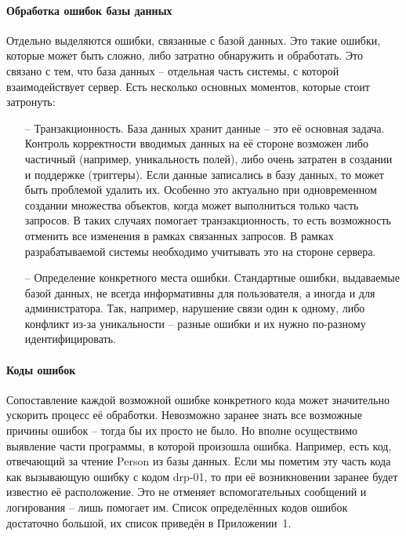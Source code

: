 \documentclass[a4paper,article]{article}
\begin{document}
\begin{sloppypar}
    \paragraph{Обработка ошибок базы данных}

    Отдельно выделяются ошибки, связанные с базой данных. Это такие ошибки, которые может быть сложно, либо затратно обнаружить и обработать. Это связано с тем, что база данных -- отдельная часть системы, с которой взаимодействует сервер. Есть несколько основных моментов, которые стоит затронуть:

    \begin{itemize}[nolistsep]
        \item[--] Транзакционность. База данных хранит данные -- это её основная задача. Контроль корректности вводимых данных на её стороне возможен либо частичный (например, уникальность полей), либо очень затратен в создании и поддержке (триггеры). Если данные записались в базу данных, то может быть проблемой удалить их. Особенно это актуально при одновременном создании множества объектов, когда может выполниться только часть запросов. В таких случаях помогает транзакционность, то есть возможность отменить все изменения в рамках связанных запросов. В рамках разрабатываемой системы необходимо учитывать это на стороне сервера.
        \item[--] Определение конкретного места ошибки. Стандартные ошибки, выдаваемые базой данных, не всегда информативны для пользователя, а иногда и для администратора. Так, например, нарушение связи один к одному, либо конфликт из-за уникальности -- разные ошибки и их нужно по-разному идентифицировать.
    \end{itemize}

    \paragraph{Коды ошибок}\label{Проектирование сервера. Коды ошибок}

    Сопоставление каждой возможной ошибке конкретного кода может значительно ускорить процесс её обработки. Невозможно заранее знать все возможные причины ошибок -- тогда бы их просто не было. Но вполне осуществимо выявление части программы, в которой произошла ошибка. Например, есть код, отвечающий за чтение Person из базы данных. Если мы пометим эту часть кода как вызывающую ошибку с кодом drp-01, то при её возникновении заранее будет известно её расположение. Это не отменяет вспомогательных сообщений и логирования -- лишь помогает им. Список определённых кодов ошибок достаточно большой, их список приведён в Приложении~1.


\end{sloppypar}
\end{document}
